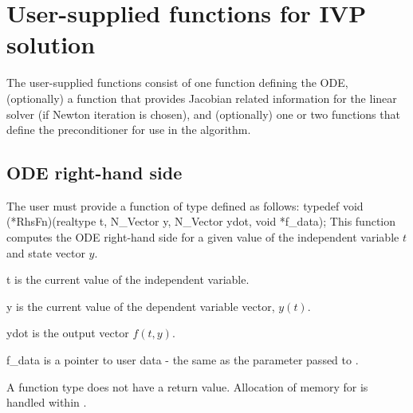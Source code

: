 \section{User-supplied functions for IVP solution}\label{ss:user_fct_sim}

The user-supplied functions consist of one function defining the ODE, 
(optionally) a function that provides Jacobian related information for the linear 
solver (if Newton iteration is chosen), and (optionally) one or two functions 
that define the preconditioner for use in the {\spgmr} algorithm. 
\subsection{ODE right-hand side} 
\label{ss:rhsFn}
The user must provide a function of type  defined as follows:
{
  typedef void (*RhsFn)(realtype t, N\_Vector y, N\_Vector ydot, void *f\_data);
}
{
  This function computes the ODE right-hand side for a given value
  of the independent variable $t$ and state vector $y$.
}
{
  \begin{args}[f\_data]
  \item[t]
    is the current value of the independent variable.
  \item[y]
    is the current value of the dependent variable vector, $y(t)$.
  \item[ydot]
    is the output vector $f(t,y)$.
  \item[f\_data]
    is a pointer to user data - the same as the       
    parameter passed to .   
  \end{args}
}
{
  A  function type does not have a return value.                        
}
{
Allocation of memory for  is handled within {\cvodes}.
}
